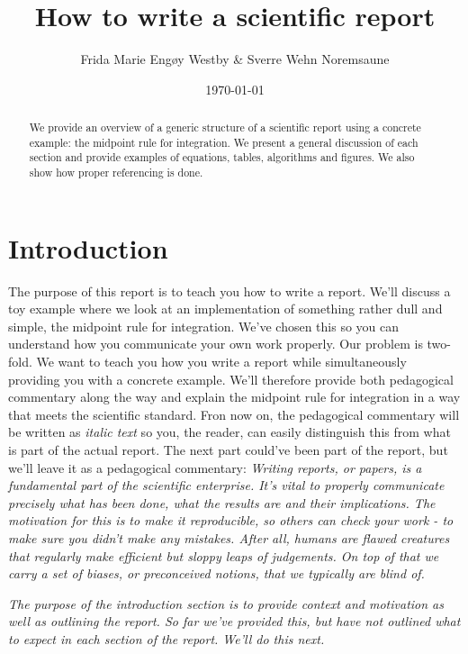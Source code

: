 \documentclass[english,notitlepage, reprint]{revtex4-1}  %
\begin{document}
	
	\title{How to write a scientific report}      %
	\author{Frida Marie Engøy Westby \& Sverre Wehn Noremsaune}          %
	\date{\today}                             %
	\noaffiliation                            %
	
	\begin{abstract}
		We provide an overview of a generic structure of a scientific report using a concrete example: the midpoint rule for integration. We present a general discussion of each section and provide examples of equations, tables, algorithms and figures. We also show how proper referencing is done.
	\end{abstract}
	\maketitle 
	
	\section{Introduction}
	The purpose of this report is to teach you how to write a report. We'll discuss a toy example where we look at an implementation of something rather dull and simple, the midpoint rule for integration. We've chosen this so you can understand how you communicate your own work properly. Our problem is two-fold. We want to teach you how you write a report while simultaneously providing you with a concrete example. We'll therefore provide both pedagogical commentary along the way and explain the midpoint rule for integration in a way that meets the scientific standard. Fron now on, the pedagogical commentary will be written as \textit{italic text} so you, the reader, can easily distinguish this from what is part of the actual report. The next part could've been part of the report, but we'll leave it as a pedagogical commentary:
	\textit{Writing reports, or papers, is a fundamental part of the scientific enterprise. It's vital to properly communicate precisely what has been done, what the results are and their implications. The motivation for this is to make it reproducible, so others can check your work - to make sure you didn't make any mistakes. After all, humans are flawed creatures that regularly make efficient but sloppy leaps of judgements. On top of that we carry a set of biases, or preconceived notions, that we typically are blind of.}
	
	\textit{The purpose of the introduction section is to provide context and motivation as well as outlining the report. So far we've provided this, but have not outlined what to expect in each section of the report. We'll do this next.}
	
\end{document}
